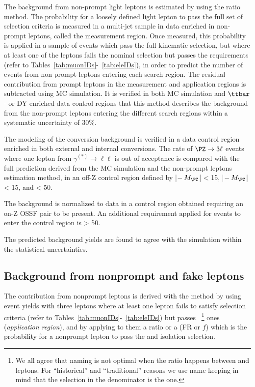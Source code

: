 The background from non-prompt light leptons is estimated by using the \ttol ratio method. 
The probability for a loosely defined light lepton to pass the full set of selection criteria is measured in a multi-jet sample in data enriched in non-prompt leptons, called the measurement region. 
Once measured, this probability is applied in a sample of events which
pass the full kinematic selection, but where at least one of the
leptons fails the nominal selection but passes the \lo requirements
(refer to Tables~\ref{tab:muonIDs}-~\ref{tab:eleIDs}), 
in order to predict the number of events from non-prompt leptons entering each search region. 
The residual contribution from prompt leptons in the measurement and application regions is subtracted using MC simulation. 
It is verified in both MC simulation and $\ttbar$- or DY-enriched data control regions that this method describes the background from the non-prompt leptons entering the different search regions within 
a systematic uncertainty of 30\%. 
 
The modeling of the conversion background is verified in a data control region enriched in both external and internal conversions. 
The rate of $\PZ \to 3\ell$ events where one lepton from $\gamma^{(*)}\to\ell\ell$ is out of acceptance is compared with 
the full prediction derived from the MC simulation and the non-prompt leptons estimation method, in an off-Z control region 
defined by |\Mll $- \:M_\PZ$| < 15\GeV, |\mlll $- \:M_\PZ$| < 15\GeV,
and \ptmiss < 50\GeV. 

The \WZ background is normalized to data in a control region obtained 
requiring an on-Z OSSF pair to be present. An additional requirement applied 
for events to enter the control region is \ptmiss > 50\GeV.

The predicted background yields are found to agree with the simulation
within the statistical uncertainties. 


\subsection{Background from nonprompt and fake leptons}\label{sec:tight_loose_method}

The contribution from nonprompt leptons is derived with the \ttol method
by using event yields with three leptons where at least one lepton fails to satisfy \ti 
selection criteria (refer to
Tables~\ref{tab:muonIDs}-~\ref{tab:eleIDs}) but passes
\fo~\footnote{We all agree that \ttol naming is not optimal when the
  ratio happens between \ti and \fo leptons. For ``historical'' and ``traditional''
  reasons we use \ttol name keeping in mind that the selection in the
  denominator is the \fo one.}
ones (\emph{application region}), 
and by applying to them  a \ttol ratio or a \fr (FR
or $f$) which is the probability for 
a nonprompt lepton to pass the \ti and isolation selection.

